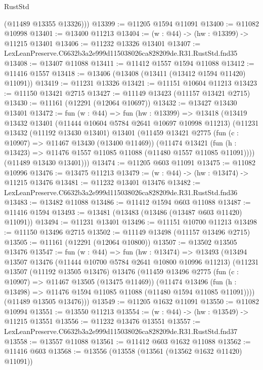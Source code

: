 \begin{lexlean}{RustStd}
\begin{coremodule}
        (@11489 @13355 @13326)))
@13399 := @11205 @1594 @11091
@13400 := @11082 @10998
@13401 := @13400 @11213
@13404 := (w : @44) -> (hw : @13399) -> @11215 @13401
@13406 := @11232 @13326 @13401
@13407 := LexLeanPreserve.C6632b3a2e999d115038026ca828209de.R31.RustStd.fnd35
@13408 := @13407 @11088
@13411 := @11412 @1557 @1594 @11088
@13412 := @11416 @1557
@13418 := @13406 (@13408 (@13411 (@13412 @1594 @11420) @11091))
@13419 := @11231 @13326
@13421 := @11151 @10604 @11213
@13423 := @11150 @13421 @2715
@13427 := @11149 @13423 (@11157 @13421 @2715)
@13430 := @11161 (@12291 (@12064 @10697))
@13432 := @13427 @13430 @13401
@13472 := fun (w : @44) =>
  fun (hw : @13399) =>
  @13418
    (@13419
      @13432
      @13401
      (@11444 @10604 @5784 @2641 @10697 @10998 @11213)
      (@11231
        @13432
        (@11192 @13430 @13401)
        @13401
        (@11459
          @13421
          @2775
          (fun (c : @10907) => @11467 @13430 (@13400 @11469))
          (@11474
            @13421
            (fun (h : @13423) => @11476 @1557 @11085 @11088 (@11480 @1557 @11085 @11091))))
        (@11489 @13430 @13401)))
@13474 := @11205 @603 @11091
@13475 := @11082 @10996
@13476 := @13475 @11213
@13479 := (w : @44) -> (hw : @13474) -> @11215 @13476
@13481 := @11232 @13401 @13476
@13482 := LexLeanPreserve.C6632b3a2e999d115038026ca828209de.R31.RustStd.fnd36
@13483 := @13482 @11088
@13486 := @11412 @1594 @603 @11088
@13487 := @11416 @1594
@13493 := @13481 (@13483 (@13486 (@13487 @603 @11420) @11091))
@13494 := @11231 @13401
@13496 := @11151 @10700 @11213
@13498 := @11150 @13496 @2715
@13502 := @11149 @13498 (@11157 @13496 @2715)
@13505 := @11161 (@12291 (@12064 @10800))
@13507 := @13502 @13505 @13476
@13547 := fun (w : @44) =>
  fun (hw : @13474) =>
  @13493
    (@13494
      @13507
      @13476
      (@11444 @10700 @5784 @2641 @10800 @10996 @11213)
      (@11231
        @13507
        (@11192 @13505 @13476)
        @13476
        (@11459
          @13496
          @2775
          (fun (c : @10907) => @11467 @13505 (@13475 @11469))
          (@11474
            @13496
            (fun (h : @13498) => @11476 @1594 @11085 @11088 (@11480 @1594 @11085 @11091))))
        (@11489 @13505 @13476)))
@13549 := @11205 @1632 @11091
@13550 := @11082 @10994
@13551 := @13550 @11213
@13554 := (w : @44) -> (hw : @13549) -> @11215 @13551
@13556 := @11232 @13476 @13551
@13557 := LexLeanPreserve.C6632b3a2e999d115038026ca828209de.R31.RustStd.fnd37
@13558 := @13557 @11088
@13561 := @11412 @603 @1632 @11088
@13562 := @11416 @603
@13568 := @13556 (@13558 (@13561 (@13562 @1632 @11420) @11091))

\end{coremodule}
\end{lexlean}
